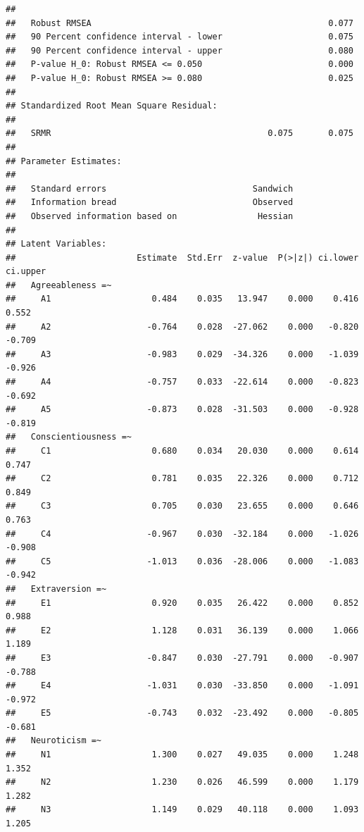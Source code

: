 \documentclass[
]{article}
\begin{document}
\begin{verbatim}
##                                                                   
##   Robust RMSEA                                               0.077
##   90 Percent confidence interval - lower                     0.075
##   90 Percent confidence interval - upper                     0.080
##   P-value H_0: Robust RMSEA <= 0.050                         0.000
##   P-value H_0: Robust RMSEA >= 0.080                         0.025
## 
## Standardized Root Mean Square Residual:
## 
##   SRMR                                           0.075       0.075
## 
## Parameter Estimates:
## 
##   Standard errors                             Sandwich
##   Information bread                           Observed
##   Observed information based on                Hessian
## 
## Latent Variables:
##                        Estimate  Std.Err  z-value  P(>|z|) ci.lower ci.upper
##   Agreeableness =~                                                          
##     A1                    0.484    0.035   13.947    0.000    0.416    0.552
##     A2                   -0.764    0.028  -27.062    0.000   -0.820   -0.709
##     A3                   -0.983    0.029  -34.326    0.000   -1.039   -0.926
##     A4                   -0.757    0.033  -22.614    0.000   -0.823   -0.692
##     A5                   -0.873    0.028  -31.503    0.000   -0.928   -0.819
##   Conscientiousness =~                                                      
##     C1                    0.680    0.034   20.030    0.000    0.614    0.747
##     C2                    0.781    0.035   22.326    0.000    0.712    0.849
##     C3                    0.705    0.030   23.655    0.000    0.646    0.763
##     C4                   -0.967    0.030  -32.184    0.000   -1.026   -0.908
##     C5                   -1.013    0.036  -28.006    0.000   -1.083   -0.942
##   Extraversion =~                                                           
##     E1                    0.920    0.035   26.422    0.000    0.852    0.988
##     E2                    1.128    0.031   36.139    0.000    1.066    1.189
##     E3                   -0.847    0.030  -27.791    0.000   -0.907   -0.788
##     E4                   -1.031    0.030  -33.850    0.000   -1.091   -0.972
##     E5                   -0.743    0.032  -23.492    0.000   -0.805   -0.681
##   Neuroticism =~                                                            
##     N1                    1.300    0.027   49.035    0.000    1.248    1.352
##     N2                    1.230    0.026   46.599    0.000    1.179    1.282
##     N3                    1.149    0.029   40.118    0.000    1.093    1.205

\end{verbatim}
\end{document}

